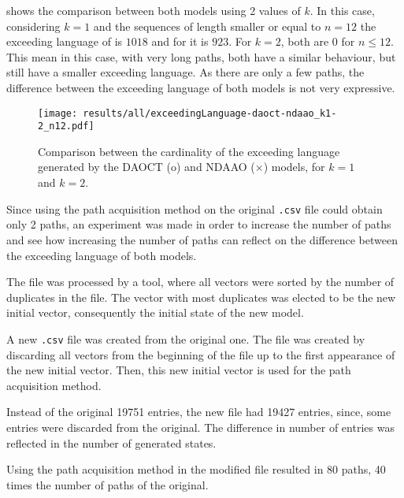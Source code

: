  shows the comparison between both models using 2 values of $k$.
In this case, considering $k=1$ and the sequences of length smaller or equal to $n=12$ the
exceeding language of \NDAAO{} is $1018$ and for \DAOCT{} it is $923$. For
$k=2$, both are $0$ for $n\leq12$. This mean in this case, with very
long paths, both have a similar behaviour, but \DAOCT{} still have a smaller
exceeding language. As there are only a few paths, the difference between the
exceeding language of both models is not very expressive. 

\begin{figure}[H]
  \centering
  \texttt{[image: results/all/exceedingLanguage-daoct-ndaao\_k1-2\_n12.pdf]}
  \caption[Comparison between the cardinality of the exceeding language generated by the DAOCT and
NDAAO.]{Comparison between the cardinality of the exceeding language generated by the DAOCT (o) and
NDAAO ($\times$) models, for $k=1$ and $k=2$.}
    \label{fig:daoctNdaaoOriginal}
\end{figure}

Since using the path acquisition method on the original \verb|.csv| file could obtain only 2 paths, an
experiment was made in order to increase the number of paths and see how
increasing the number of paths can reflect on the difference between the
exceeding language of both models.

The file was processed by a tool, where all vectors
were sorted by the number of duplicates in the file. The vector with most
duplicates was elected to be the new initial vector, consequently the initial
state of the new model.

A new \verb|.csv| file was created from the original one. The file was created by
discarding all vectors from the beginning of the file up to the
first appearance of the new initial vector. Then, this new initial vector is used
for the path acquisition method.

Instead of the original 19751 entries, the new
file 
had 19427 entries, since, some entries were discarded from the original. The difference in number of entries was reflected in the number of
generated states.

Using the path acquisition method in the modified file resulted in 80 paths, 40 times the
number of paths of the original.  

